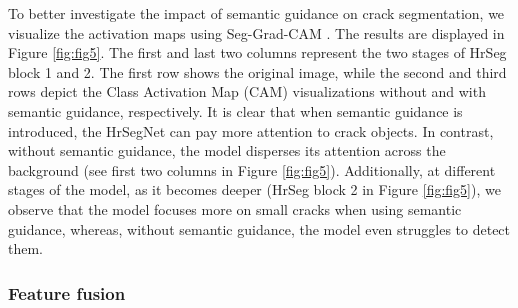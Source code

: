 \documentclass[preprint,12pt,authoryear]{elsarticle}
\begin{document}
To better investigate the impact of semantic guidance on crack segmentation, we visualize the activation maps using Seg-Grad-CAM \citep{vinogradova_towards_2020}. The results are displayed in Figure \ref{fig:fig5}. The first and last two columns represent the two stages of HrSeg block 1 and 2. The first row shows the original image, while the second and third rows depict the Class Activation Map (CAM) visualizations without and with semantic guidance, respectively. It is clear that when semantic guidance is introduced, the HrSegNet can pay more attention to crack objects. In contrast, without semantic guidance, the model disperses its attention across the background (see first two columns in Figure \ref{fig:fig5}). Additionally, at different stages of the model, as it becomes deeper (HrSeg block 2 in Figure \ref{fig:fig5}), we observe that the model focuses more on small cracks when using semantic guidance, whereas, without semantic guidance, the model even struggles to detect them.





\subsubsection{Feature fusion}
\label{subsubsec:featurefusion}
\end{document}
